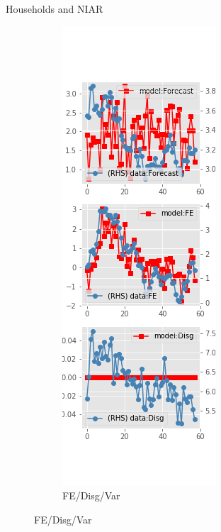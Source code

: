 \documentclass{beamer}
\begin{document}
\begin{frame}{Households and NIAR}
\begin{figure}[ht]
\begin{subfigure}[b]{0.2\textwidth}
		\end{subfigure}
		\hfill
		\begin{subfigure}[b]{0.2\textwidth}
			\caption{FE/Disg/Var}
			\includegraphics[width=\textwidth, height = 0.8\textheight]{figuresDraft/sce_ni_est_diag3.png}
		\end{subfigure}
	\end{figure}
\end{frame}
\end{document}
